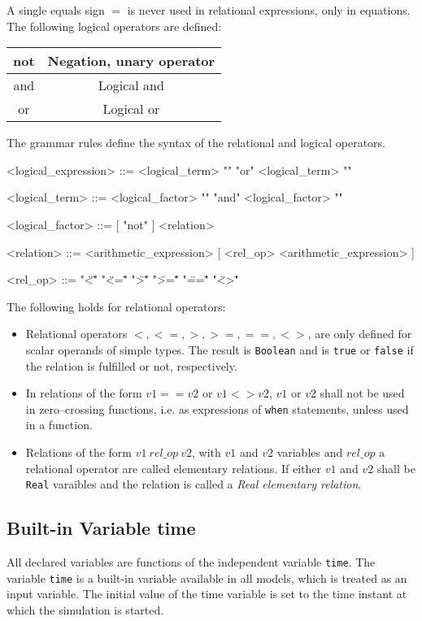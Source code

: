 \documentclass[11pt,a4paper,notitlepage]{report}
\begin{document}
A single equals sign $=$ is never used in relational expressions, only in equations.
The following logical operators are defined:

\begin{center}
\begin{tabular}{|c|c|}
	\hline
	not & Negation, unary operator \\	
	\hline
	and & Logical and \\
	\hline
	or & Logical or \\
	\hline
\end{tabular}
\end{center}

The grammar rules define the syntax of the relational and logical operators.

\begin{grammar}\scriptsize
<logical_expression> ::= <logical_term> "{" "or" <logical_term> "}"

<logical_term> ::= <logical_factor> "{" "and" <logical_factor> "}" 

<logical_factor> ::= [ "not" ] <relation>

<relation> ::= <arithmetic_expression> [ <rel_op> <arithmetic_expression> ]

<rel_op> ::= "\"<\"" \alt "\"<=\"" \alt "\">\"" \alt "\">=\"" \alt "\"==\"" \alt "\"<>\""
\end{grammar}

The following holds for relational operators:
\begin{itemize}
\item Relational operators $<, <=, >, >=, ==, <>$, are only defined for scalar operands of simple types. The result is \verb"Boolean" and is \verb"true" or \verb"false" if the relation is fulfilled or not, respectively. 
\item In relations of the form $v1 == v2$ or $v1 <> v2$, $v1$ or $v2$ shall not be used in zero--crossing functions, i.e. as expressions of \verb"when" statements, unless used in a function.
\item Relations of the form $v1\ rel\_op\ v2$, with $v1$ and $v2$ variables and $rel\_op$ a relational operator are called elementary relations. If either $v1$ and $v2$ shall be \verb"Real" varaibles and the relation is called a \emph{Real elementary relation}.  
\end{itemize}

\subsection{Built-in Variable time}
All declared variables are functions of the independent variable \verb"time". The variable \verb"time" is a built-in variable available in all models, which is treated as an input variable. The initial value of the time variable is set to the time instant at which the simulation is started.
\end{document}
